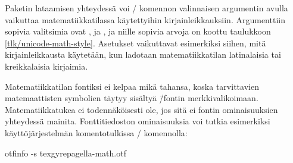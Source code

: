 
\noindent
Paketin  lataamisen yhteydessä voi
\-/ komennon valinnaisen argumentin avulla vaikuttaa
matematiikkatilassa käytettyihin kirjainleikkauksiin. Argumenttiin
sopivia valitsimia ovat ,  ja
, ja niille sopivia arvoja on koottu taulukkoon
\ref{tlk/unicode-math-style}. Asetukset vaikuttavat esimerkiksi siihen,
mitä kirjainleikkausta käytetään, kun ladotaan matematiikkatilan
latinalaisia tai kreikkalaisia kirjaimia.

\begin{koodilohkosis}
\usepackage[math-style=ISO]{unicode-math}
\end{koodilohkosis}

\noindent
Matematiikkatilan fontiksi ei kelpaa mikä tahansa, koska tarvittavien
matemaattisten symbolien täytyy sisältyä  \=/fontin
merkkivalikoimaan. Matematiikkatukea ei todennäköisesti ole, jos sitä ei
fontin ominaisuuksien yhteydessä mainita. Fonttitiedoston ominaisuuksia
voi tutkia esimerkiksi käyttöjärjestelmän komentotulkissa
\-/ komennolla:

\begin{koodilohkosis}
otfinfo -s texgyrepagella-math.otf
\end{koodilohkosis}


